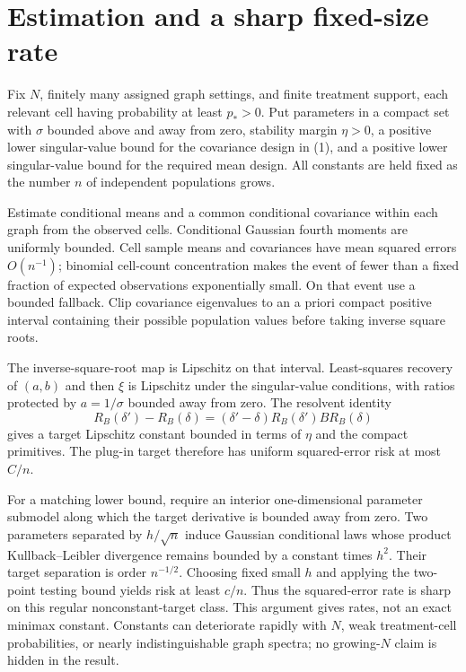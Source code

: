 \documentclass[11pt]{article}
\begin{document}
\section*{Estimation and a sharp fixed-size rate}
Fix $N$, finitely many assigned graph settings, and finite treatment support, each relevant cell having probability at least $p_*>0$. Put parameters in a compact set with $\sigma$ bounded above and away from zero, stability margin $\eta>0$, a positive lower singular-value bound for the covariance design in (1), and a positive lower singular-value bound for the required mean design. All constants are held fixed as the number $n$ of independent populations grows.

Estimate conditional means and a common conditional covariance within each graph from the observed cells. Conditional Gaussian fourth moments are uniformly bounded. Cell sample means and covariances have mean squared errors $O(n^{-1})$; binomial cell-count concentration makes the event of fewer than a fixed fraction of expected observations exponentially small. On that event use a bounded fallback. Clip covariance eigenvalues to an a priori compact positive interval containing their possible population values before taking inverse square roots.

The inverse-square-root map is Lipschitz on that interval. Least-squares recovery of $(a,b)$ and then $\xi$ is Lipschitz under the singular-value conditions, with ratios protected by $a=1/\sigma$ bounded away from zero. The resolvent identity
\[
 R_B(\delta')-R_B(\delta)
 =(\delta'-\delta)R_B(\delta')BR_B(\delta)
\]
gives a target Lipschitz constant bounded in terms of $\eta$ and the compact primitives. The plug-in target therefore has uniform squared-error risk at most $C/n$.

For a matching lower bound, require an interior one-dimensional parameter submodel along which the target derivative is bounded away from zero. Two parameters separated by $h/\sqrt n$ induce Gaussian conditional laws whose product Kullback--Leibler divergence remains bounded by a constant times $h^2$. Their target separation is order $n^{-1/2}$. Choosing fixed small $h$ and applying the two-point testing bound yields risk at least $c/n$. Thus the squared-error rate is sharp on this regular nonconstant-target class. This argument gives rates, not an exact minimax constant. Constants can deteriorate rapidly with $N$, weak treatment-cell probabilities, or nearly indistinguishable graph spectra; no growing-$N$ claim is hidden in the result.
\end{document}
